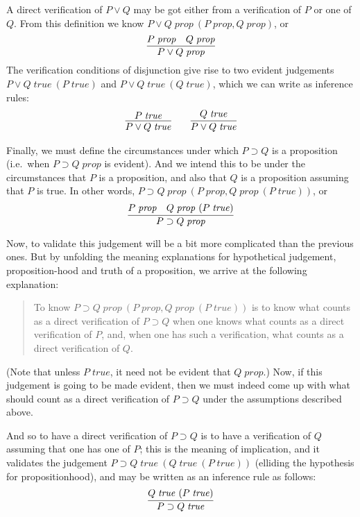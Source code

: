 \documentclass{amsart}
\theoremstyle{definition}
\theoremstyle{remark}
\numberwithin{equation}{section}
\newcommand\isprop[1]{\ensuremath{#1\;\mathit{prop}}}
\newcommand\istrue[1]{\ensuremath{#1\;\mathit{true}}}
\newcommand\hyp[2]{\ensuremath{#1\ (#2)}}
\begin{document}
A direct verification of $P\lor Q$ may be got either from a verification
of $P$ or one of $Q$. From this definition we know \hyp{\isprop{P\lor
Q}}{\isprop{P},\isprop{Q}}, or
\[
  \infer{
    \isprop{P\lor Q}
  }{
    \isprop{P} &
    \isprop{Q}
  }
\]
The verification conditions of disjunction give
rise to two evident judgements \hyp{\istrue{P\lor Q}}{\istrue{P}} and
\hyp{\istrue{P\lor Q}}{\istrue{Q}}, which we can write as inference rules:
\begin{gather*}
  \infer{
    \istrue{P\lor Q}
  }{
    \istrue{P}
  }
  \qquad
  \infer{
    \istrue{P\lor Q}
  }{
    \istrue{Q}
  }
\end{gather*}

Finally, we must define the circumstances under which $P\supset Q$ is a
proposition (i.e.\ when \isprop{P\supset Q} is evident). And we intend this to
be under the circumstances that $P$ is a proposition, and also that $Q$ is a
proposition assuming that $P$ is true. In other words, \hyp{\isprop{P\supset
Q}}{\isprop{P}, \hyp{\isprop{Q}}{\istrue{P}}}, or
\[
  \infer{
    \isprop{P\supset Q}
  }{
    \isprop{P} &
    \hyp{\isprop{Q}}{\istrue{P}}
  }
\]

Now, to validate this judgement will be a bit more complicated than the
previous ones. But by unfolding the meaning explanations for hypothetical
judgement, proposition-hood and truth of a proposition, we arrive at the
following explanation:
\begin{quote}
  To know \hyp{\isprop{P\supset Q}}{\isprop{P},\hyp{\isprop{Q}}{\istrue{P}}} is
  to know what counts as a direct verification of $P\supset Q$ when one knows what
  counts as a direct verification of $P$, and, when one has such a verification, what
  counts as a direct verification of $Q$.
\end{quote}

(Note that unless \istrue{P}, it need not be evident that \isprop{Q}.) Now, if
this judgement is going to be made evident, then we must indeed come up with
what should count as a direct verification of $P\supset Q$ under the
assumptions described above.

And so to have a direct verification of $P\supset Q$ is to have a
verification of $Q$ assuming that one has one of $P$; this is the meaning of
implication, and it validates the judgement \hyp{\istrue{P\supset
Q}}{\hyp{\istrue{Q}}{\istrue{P}}} (elliding the hypothesis for
propositionhood), and may be written as an inference rule as follows:
\[
  \infer{
    \istrue{P\supset Q}
  }{
    \hyp{\istrue{Q}}{\istrue{P}}
  }
\]
\end{document}
